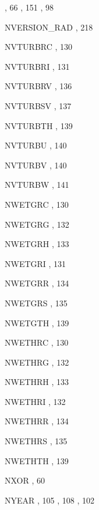 \begin{theindex}
    \subitem {},  66
    \subitem {},  151
    \subitem {},  98
  \item NVERSION\_RAD
    \subitem {},  218
  \item NVTURBRC
    \subitem {},  130
  \item NVTURBRI
    \subitem {},  131
  \item NVTURBRV
    \subitem {},  136
  \item NVTURBSV
    \subitem {},  137
  \item NVTURBTH
    \subitem {},  139
  \item NVTURBU
    \subitem {},  140
  \item NVTURBV
    \subitem {},  140
  \item NVTURBW
    \subitem {},  141
  \item NWETGRC
    \subitem {},  130
  \item NWETGRG
    \subitem {},  132
  \item NWETGRH
    \subitem {},  133
  \item NWETGRI
    \subitem {},  131
  \item NWETGRR
    \subitem {},  134
  \item NWETGRS
    \subitem {},  135
  \item NWETGTH
    \subitem {},  139
  \item NWETHRC
    \subitem {},  130
  \item NWETHRG
    \subitem {},  132
  \item NWETHRH
    \subitem {},  133
  \item NWETHRI
    \subitem {},  132
  \item NWETHRR
    \subitem {},  134
  \item NWETHRS
    \subitem {},  135
  \item NWETHTH
    \subitem {},  139
  \item NXOR
    \subitem {},  60
  \item NYEAR
    \subitem {},  105
    \subitem {},  108
    \subitem {},  102

\end{theindex}
